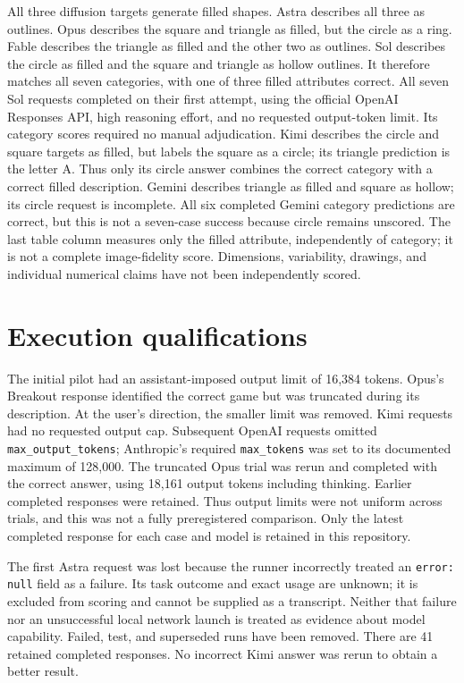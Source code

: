 \documentclass[11pt]{article}
\begin{document}
All three diffusion targets generate filled shapes. Astra describes all three
as outlines. Opus describes the square and triangle as filled, but the circle
as a ring. Fable describes the triangle as filled and the other two as outlines.
Sol describes the circle as filled and the square and triangle as hollow outlines.
It therefore matches all seven categories, with one of three filled attributes
correct. All seven Sol requests completed on their first attempt, using the
official OpenAI Responses API, high reasoning effort, and no requested output-token
limit. Its category scores required no manual adjudication.
Kimi describes the circle and square targets as filled, but labels the square
as a circle; its triangle prediction is the letter A. Thus only its circle answer
combines the correct category with a correct filled description.
Gemini describes triangle as filled and square as hollow; its circle request
is incomplete. All six completed Gemini category predictions are correct,
but this is not a seven-case success because circle remains unscored.
The last table column measures only the filled attribute, independently of category;
it is not a complete image-fidelity score. Dimensions, variability, drawings,
and individual numerical claims have not been independently scored.

\section*{Execution qualifications}
The initial pilot had an assistant-imposed output limit of 16,384 tokens.
Opus's Breakout response identified the correct game but was truncated during
its description. At the user's direction, the smaller limit was removed.
Kimi requests had no requested output cap. Subsequent OpenAI requests omitted \texttt{max\_output\_tokens}; Anthropic's
required \texttt{max\_tokens} was set to its documented maximum of 128,000.
The truncated Opus trial was rerun and completed with the correct answer,
using 18,161 output tokens including thinking. Earlier completed responses
were retained. Thus output limits were not uniform across trials, and this
was not a fully preregistered comparison. Only the latest completed response
for each case and model is retained in this repository.

The first Astra request was lost because the runner incorrectly treated an
\texttt{error: null} field as a failure. Its task outcome and exact usage are
unknown; it is excluded from scoring and cannot be supplied as a transcript.
Neither that failure nor an unsuccessful local network launch is treated as
evidence about model capability. Failed, test, and superseded runs have been
removed. There are 41 retained completed responses. No incorrect Kimi answer was rerun
to obtain a better result.
\end{document}
